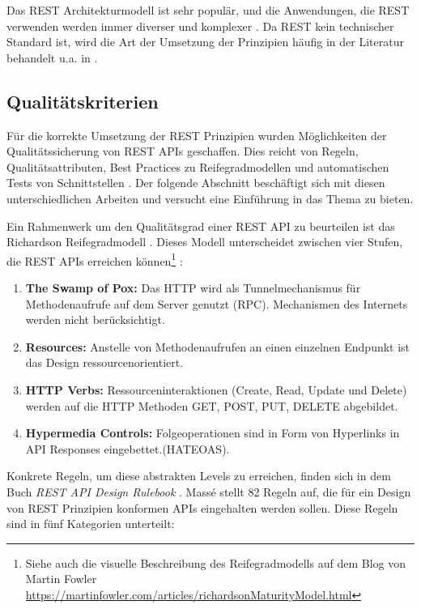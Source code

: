 Das \acs{REST} Architekturmodell ist sehr populär, und die Anwendungen, die \acs{REST} verwenden werden immer diverser und komplexer \parencite{kotstein_which_2021}. Da \acs{REST} kein technischer Standard ist, wird die Art der Umsetzung der Prinzipien häufig in der Literatur behandelt u.a. in \parencite{richardson_restful_2007}\parencite{masse_rest_2011}\parencite{webber_rest_2010}\parencite{renzel_todays_2012}.

\subsection{Qualitätskriterien} \label{sec:qualitätskriterien}
Für die korrekte Umsetzung der \acs{REST} Prinzipien wurden Möglichkeiten der Qualitätssicherung von \acs{REST} \acs{API}s geschaffen. Dies reicht von Regeln, Qualitätsattributen, Best Practices zu Reifegradmodellen und automatischen Tests von Schnittstellen \parencite{kotstein_which_2021}. Der folgende Abschnitt beschäftigt sich mit diesen unterschiedlichen Arbeiten und versucht eine Einführung in das Thema zu bieten.

Ein Rahmenwerk um den Qualitätsgrad einer \acs{REST} \acs{API} zu beurteilen ist das Richardson Reifegradmodell \parencite{richardson_restful_2007}. Dieses Modell unterscheidet zwischen vier Stufen, die \acs{REST} \acs{API}s erreichen können\footnote{Siehe auch die visuelle Beschreibung des Reifegradmodells auf dem Blog von Martin Fowler \href{https://martinfowler.com/articles/richardsonMaturityModel.html}{https://martinfowler.com/articles/richardsonMaturityModel.html}} \parencite{pautasso_restful_2014}:
\begin{enumerate}
  \item \textbf{The Swamp of Pox:} Das \acf{HTTP} wird als Tunnelmechanismus für Methodenaufrufe auf dem Server genutzt (\acf{RPC}). Mechanismen des Internets werden nicht berücksichtigt.
  \item \textbf{Resources:} Anstelle von Methodenaufrufen an einen einzelnen Endpunkt ist das Design ressourcenorientiert.
  \item \textbf{HTTP Verbs:} Ressourceninteraktionen (Create, Read, Update und Delete) werden auf die \acs{HTTP} Methoden GET, POST, PUT, DELETE abgebildet.
  \item \textbf{Hypermedia Controls:} Folgeoperationen sind in Form von Hyperlinks in \acs{API} Responses eingebettet.(\acs{HATEOAS}).
\end{enumerate}

Konkrete Regeln, um diese abstrakten Levels zu erreichen, finden sich in dem Buch \textit{REST API Design Rulebook} \parencite{masse_rest_2011}.
Massé stellt 82 Regeln auf, die für ein Design von \acs{REST} Prinzipien konformen \acs{API}s eingehalten werden sollen. Diese Regeln sind in fünf Kategorien unterteilt:


